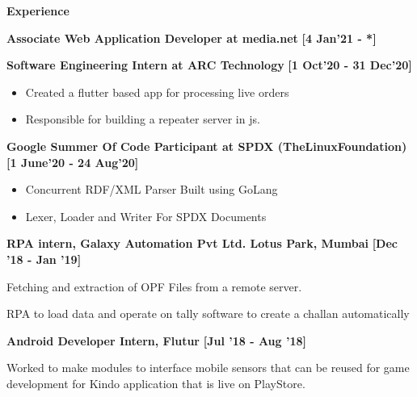 \colorbox{titleColor}{\parbox{6.7in}{\textbf{Experience}}}

\begin{itemize*}
    \setlength{\itemsep}{.00pt}
    \item \textbf{{Associate Web Application Developer at media.net}}
    \hfill {\small{{\textbf{[4 Jan'21 - *]}}\/}}

    \item \textbf{{Software Engineering Intern at ARC Technology}}
    \hfill {\small{{\textbf{[1 Oct'20 - 31 Dec'20]}}\/}}
    \begin{itemize}
        \item Created a flutter based app for processing live orders
        \item Responsible for building a repeater server in js.
    \end{itemize}

    \item \textbf{{Google Summer Of Code Participant at SPDX (TheLinuxFoundation)}}
    \hfill {\small{{\textbf{[1 June'20 - 24 Aug'20]}}\/}}
    \begin{itemize}
        \item Concurrent RDF/XML Parser Built using GoLang
        \item Lexer, Loader and Writer For SPDX Documents
    \end{itemize}

    \item \textbf{{RPA intern, Galaxy Automation Pvt Ltd. Lotus Park, Mumbai}} \hfill {\small{{\textbf{[Dec '18 - Jan '19]}}\/}}
    \begin{itemize*}
        \item Fetching and extraction of OPF Files from a remote server.
        \item RPA to load data and operate on tally software to create a challan automatically
    \end{itemize*}

    \item \textbf{{Android Developer Intern, Flutur}} \hfill {\small{{\textbf{[Jul '18 - Aug '18]}}\/}}
    \begin{itemize*}
        \item Worked to make modules to interface mobile sensors that can be reused for game development for Kindo application that is live on PlayStore.
    \end{itemize*}
\end{itemize*}

